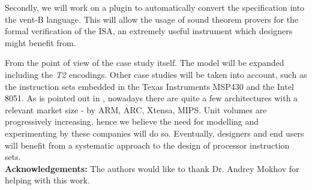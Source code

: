 \documentclass[conference]{IEEEtran}
\begin{document}
Secondly, we will work on a plugin to automatically convert the specification into the
vent-B language. This will allow the usage of sound theorem provers for the formal
verification of the ISA, an extremely useful instrument which designers might benefit from.

From the point of view of the case study itself. The model will be expanded including the
\textit{T2} encodings. Other case studies will be taken into account, such as the instruction
sets embedded in the Texas Instruments MSP430 and the Intel 8051. As is pointed out in
\cite{webArticle}, nowadays there are quite a few architectures with a relevant market size -
by ARM, ARC, Xtensa, MIPS. Unit volumes are progressively increasing, hence we believe the
need for modelling and experimenting by these companies will do so. Eventually, designers and
end users will benefit from a systematic approach to the design of processor instruction sets.\\

\noindent\textbf{Acknowledgements:} The authors would like to thank Dr. Andrey Mokhov for
helping with this work.

\end{document}
